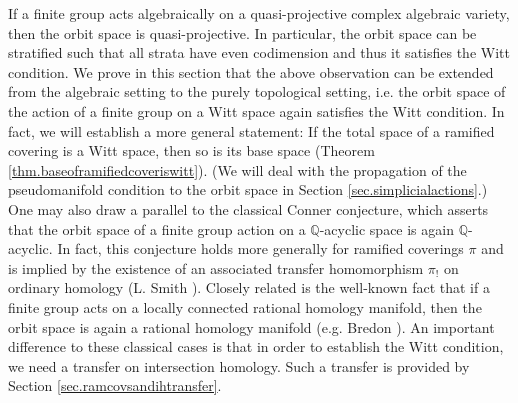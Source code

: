 \documentclass{amsart}
\theoremstyle{definition}
\theoremstyle{remark}
\newcommand {\rat}   {\ensuremath{\mathbb{Q}}}
\begin{document}
If a finite group acts algebraically on a quasi-projective complex algebraic
variety, then the orbit space is quasi-projective.
In particular, the orbit space can be stratified such that all strata
have even codimension and thus it satisfies the Witt condition.
We prove in this section that the above observation can be extended
from the algebraic setting to the purely topological setting, i.e.
the orbit space of the action of a finite group on a Witt space again
satisfies the Witt condition. In fact, we will establish a more general
statement: If the total space of a ramified covering is a Witt space,
then so is its base space (Theorem \ref{thm.baseoframifiedcoveriswitt}).
(We will deal with the propagation of the pseudomanifold condition
to the orbit space in Section \ref{sec.simplicialactions}.)
One may also draw a parallel to the
classical Conner conjecture, which asserts that the orbit space
of a finite group action on a $\rat$-acyclic space is again
$\rat$-acyclic. In fact, this conjecture holds more generally
for ramified coverings $\pi$ and is implied by the existence of 
an associated transfer homomorphism $\pi_!$ on ordinary homology
(L. Smith \cite[Cor. 2.4]{smithlarry}).
Closely related is the well-known fact that if a finite group acts on
a locally connected rational homology manifold, then the orbit space
is again a rational homology manifold (e.g. Bredon \cite{bredonsheaftheory}).
An important difference to these classical cases is that in order to establish
the Witt condition, we need a transfer on intersection homology.
Such a transfer is provided by Section \ref{sec.ramcovsandihtransfer}.
\end{document}
